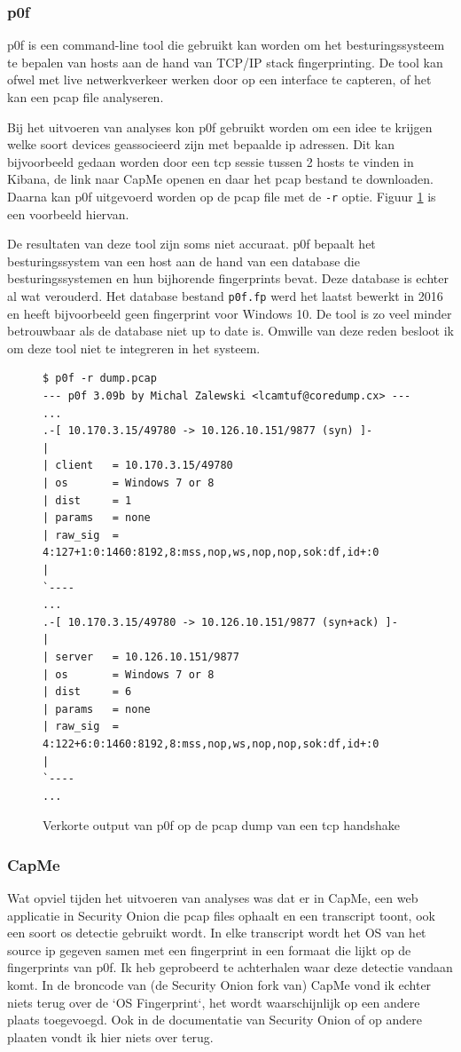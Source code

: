 \documentclass[a4paper,12pt]{report}
\begin{document}
\subsubsection{p0f}
p0f is een command-line tool die gebruikt kan worden om het besturingssysteem te bepalen van hosts aan de hand van TCP/IP stack fingerprinting.
De tool kan ofwel met live netwerkverkeer werken door op een interface te capteren, of het kan een pcap file analyseren.

Bij het uitvoeren van analyses kon p0f gebruikt worden om een idee te krijgen welke soort devices geassocieerd zijn met bepaalde ip adressen.
Dit kan bijvoorbeeld gedaan worden door een tcp sessie tussen 2 hosts te vinden in Kibana, de link naar CapMe openen en daar het pcap bestand te downloaden.
Daarna kan p0f uitgevoerd worden op de pcap file met de \lstinline|-r| optie.
Figuur \ref{fig:p0f-so-voorbeeld} is een voorbeeld hiervan.

De resultaten van deze tool zijn soms niet accuraat.
p0f bepaalt het besturingssystem van een host aan de hand van een database die besturingssystemen en hun bijhorende fingerprints bevat.
Deze database is echter al wat verouderd.
Het database bestand \lstinline|p0f.fp| werd het laatst bewerkt in 2016 en heeft bijvoorbeeld geen fingerprint voor Windows 10.
De tool is zo veel minder betrouwbaar als de database niet up to date is.
Omwille van deze reden besloot ik om deze tool niet te integreren in het systeem.

\begin{figure}[H]
  \begin{lstlisting}
$ p0f -r dump.pcap                                           
--- p0f 3.09b by Michal Zalewski <lcamtuf@coredump.cx> ---
...
.-[ 10.170.3.15/49780 -> 10.126.10.151/9877 (syn) ]-
|
| client   = 10.170.3.15/49780
| os       = Windows 7 or 8
| dist     = 1
| params   = none
| raw_sig  = 4:127+1:0:1460:8192,8:mss,nop,ws,nop,nop,sok:df,id+:0
|
`----
...
.-[ 10.170.3.15/49780 -> 10.126.10.151/9877 (syn+ack) ]-
|
| server   = 10.126.10.151/9877
| os       = Windows 7 or 8
| dist     = 6
| params   = none
| raw_sig  = 4:122+6:0:1460:8192,8:mss,nop,ws,nop,nop,sok:df,id+:0
|
`----
...
  \end{lstlisting}
  \caption{Verkorte output van p0f op de pcap dump van een tcp handshake}
  \label{fig:p0f-so-voorbeeld}
\end{figure}

\subsubsection{CapMe}
Wat opviel tijden het uitvoeren van analyses was dat er in CapMe, een web applicatie in Security Onion die pcap files ophaalt en een transcript toont, ook een soort os detectie gebruikt wordt.
In elke transcript wordt het OS van het source ip gegeven samen met een fingerprint in een formaat die lijkt op de fingerprints van p0f.
Ik heb geprobeerd te achterhalen waar deze detectie vandaan komt.
In de broncode van (de Security Onion fork van) CapMe vond ik echter niets terug over de `OS Fingerprint`, het wordt waarschijnlijk op een andere plaats toegevoegd.
Ook in de documentatie van Security Onion of op andere plaaten vondt ik hier niets over terug.
\end{document}

